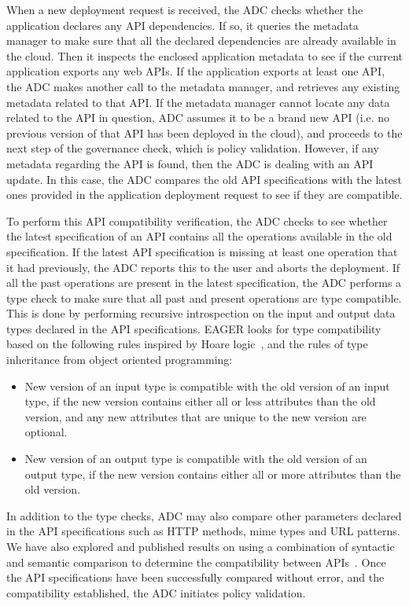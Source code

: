 When a new deployment request is received, the ADC checks whether the
application declares any API dependencies. If so, it queries the metadata
manager to make sure that all the declared dependencies are already available
in the cloud.  Then it inspects the enclosed application metadata to see if
the current application exports any web APIs. If the application exports at
least one API, the ADC makes another call to the metadata manager, and retrieves
any existing metadata related to that API. If the metadata manager cannot
locate any data related to the API in question, ADC assumes it to be a brand
new API (i.e. no previous version of that API has been deployed in the cloud),
and proceeds to the next step of the governance check, which is policy
validation. However, if any metadata regarding the API is found, then the ADC
is dealing with an API update. In this case, the ADC compares the old API
specifications with the latest ones provided in the application deployment
request to see if they are compatible.

To perform this API compatibility verification, the ADC checks to see whether
the latest specification of an API contains all the operations available in
the old specification. If the latest API specification is missing at least one
operation that it had previously, the ADC reports this to the user and aborts
the deployment. If all the past operations are present in the latest
specification, the ADC performs a type check to make sure that all past and
present operations are type compatible. This is done by performing recursive
introspection on the input and output data types declared in the API
specifications. EAGER looks for type compatibility based on the following
rules inspired by Hoare logic~\cite{Hoare:1969:ABC:363235.363259}, and the
rules of type inheritance from object oriented programming:
\begin{itemize}
\vspace{0.1in}
\item New version of an input type is compatible with the old version of an input type, if the new version contains either all or less attributes than the 
old version, and any new attributes that are unique to the new version are optional.
\vspace{0.1in}
\item New version of an output type is compatible with the old version of an output type, if the new version contains either all or more attributes than the 
old version.
\vspace{0.1in}
\end{itemize}
In addition to the type checks, ADC may also compare other parameters declared in the API specifications
such as HTTP methods, mime types and URL patterns. We have also explored and 
published results on using a combination of syntactic and semantic comparison
to determine the compatibility between APIs~\cite{6930607,jayathilaka2014using}.
Once the API specifications have been successfully compared without error, and 
the compatibility established, the ADC initiates policy validation. 

